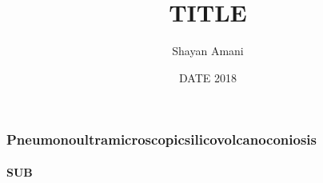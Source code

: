 \documentclass{beamer}
\title{TITLE}
\author{Shayan Amani}
\date{DATE 2018}
\institute{Department of Computer Science, University of New Hampshire}
\begin{document}
  \begin{frame}
    \titlepage
  \end{frame}

\begin{frame}
    \frametitle{Pneumonoultramicroscopicsilicovolcanoconiosis}
    \framesubtitle{SUB}

  \end{frame}

\end{document}
